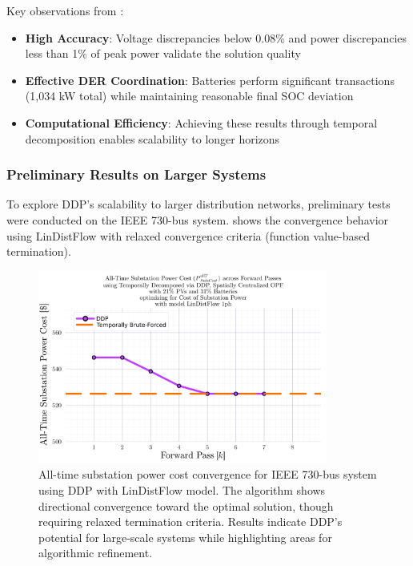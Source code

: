 Key observations from :
\begin{itemize}
    \item \textbf{High Accuracy}: Voltage discrepancies below 0.08\% and power discrepancies less than 1\% of peak power validate the solution quality
    \item \textbf{Effective DER Coordination}: Batteries perform significant transactions (1,034 kW total) while maintaining reasonable final SOC deviation
    \item \textbf{Computational Efficiency}: Achieving these results through temporal decomposition enables scalability to longer horizons
\end{itemize}

\subsubsection{Preliminary Results on Larger Systems}

To explore DDP's scalability to larger distribution networks, preliminary tests were conducted on the IEEE 730-bus system.  shows the convergence behavior using LinDistFlow with relaxed convergence criteria (function value-based termination).

\begin{figure}[h]
    \centering
    \includegraphics[width=0.85\textwidth]{figures/SubstationPowerCostAllTime_vs_k_8_for_subsPowerCost_min_with_scd_alpha_1_08_gamma_0_0_via_tmprl_dcmpsd_spat_centr_system_with_ldf_1ph.png}
    \caption{All-time substation power cost convergence for IEEE 730-bus system using DDP with LinDistFlow model. The algorithm shows directional convergence toward the optimal solution, though requiring relaxed termination criteria. Results indicate DDP's potential for large-scale systems while highlighting areas for algorithmic refinement.}
    \label{fig:ddp-convergence-ieee730}
\end{figure}

